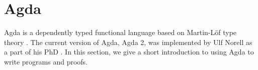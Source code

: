 \section{Agda}
\label{Agda}
Agda is a dependently typed functional language based on Martin-Löf type theory \cite{Martin-Löf}. The current version of Agda, Agda 2, was implemented by Ulf Norell as a part of his PhD \citep{NorellAgda}.
In this section, we give a short introduction to using Agda to write programs and proofs.

